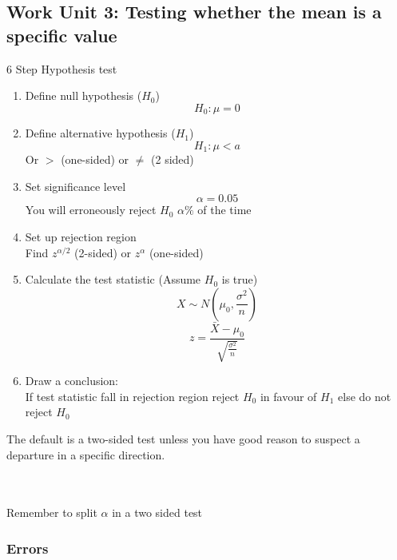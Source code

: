 \documentclass[a4paper,10pt]{article}
\begin{document}
\subsection{Work Unit 3: Testing whether the mean is a specific value}
6 Step Hypothesis test
\begin{enumerate}
	\item Define null hypothesis ($H_0$) \[H_0: \mu = 0\]
	\item Define alternative hypothesis ($H_1$) \[H_1: \mu < a\] Or $>$ (one-sided) or $\neq$ (2 sided)
	\item Set significance level \[\alpha = 0.05\] You will erroneously reject $H_0$ $\alpha \%$ of the time
	\item Set up rejection region \\ Find $z^{\alpha/2}$ (2-sided) or $z^{\alpha}$ (one-sided)
	\item Calculate the test statistic (Assume $H_0$ is true) \[ X \sim N(\mu_0, \frac{\sigma^2}{n})\] \[ z = \frac{\bar{X}-\mu_0}{\sqrt{\frac{\sigma^2}{n}}}\]
	\item Draw a conclusion: \\ If test statistic fall in rejection region reject $H_0$ in favour of $H_1$ else do not reject $H_0$
\end{enumerate}
The default is a two-sided test unless you have good reason to suspect a departure in a specific direction.

\\ \\
Remember to split $\alpha$ in a two sided test

\subsubsection{Errors}
\end{document}
